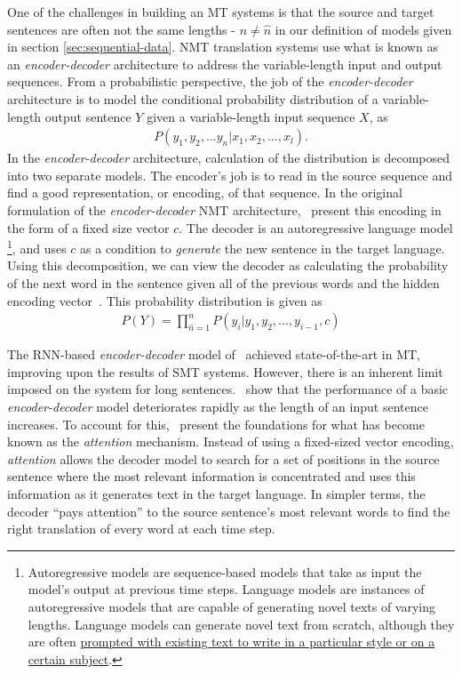 \newcommand{\ed}{\emph{encoder-decoder}}
One of the challenges in building an MT systems is that the source and target sentences are often not the same lengths - $n \neq \hat{n}$ in our definition of \seq{} models given in section \ref{sec:sequential-data}. NMT translation systems use what is known as an \ed{} architecture to address the variable-length input and output sequences. From a probabilistic perspective, the job of the \ed{} architecture is to model the conditional probability distribution of a variable-length output sentence $Y$ given a variable-length input sequence $X$, as
\begin{align*}
P(y_1, y_2, ... y_n | x_1, x_2, ..., x_l). 
\end{align*}
In the \ed{} architecture, calculation of the distribution is decomposed into two separate models. The encoder's job is to read in the source sequence and find a good representation, or encoding, of that sequence. In the original formulation of the \ed{} NMT architecture,~\citet{cho2014learning} present this encoding in the form of a fixed size vector $c$. The decoder is an autoregressive language model%
\footnote{Autoregressive models are sequence-based models that take as input the model's output at previous time steps. Language models are instances of autoregressive models that are capable of generating novel texts of varying lengths. Language models can generate novel text from scratch, although they are often \href{https://transformer.huggingface.co/doc/distil-gpt2}{prompted with existing text to write in a particular style or on a certain subject}.}, and uses $c$ as a condition to \emph{generate} the new sentence in the target language. Using this decomposition, we can view the decoder as calculating the probability of the next word in the sentence given all of the previous words and the hidden encoding vector~\cite{bahdanau2014neural}. This probability distribution is given as
\begin{align*}
P(Y) = \prod_{\hat{n}=1}^{n}P(y_i \vert y_1, y_2, ..., y_{i-1}, c)    
\end{align*}


\newcommand{\at}[1]{\emph{#1}}

The RNN-based \ed{} model of~\citet{cho2014learning} achieved state-of-the-art in MT, improving upon the results of SMT systems. However, there is an inherent limit imposed on the system for long sentences.~\citet{cho2014learning} show that the performance of a basic \ed{} model deteriorates rapidly as the length of an input sentence increases. To account for this,~\citet{bahdanau2014neural} present the foundations for what has become known as the \at{attention} mechanism. Instead of using a fixed-sized vector encoding, \at{attention} allows the decoder model to search for a set of positions in the source sentence where the most relevant information is concentrated and uses this information as it generates text in the target language. In simpler terms, the decoder ``pays attention'' to the source sentence's most relevant words to find the right translation of every word at each time step. 

